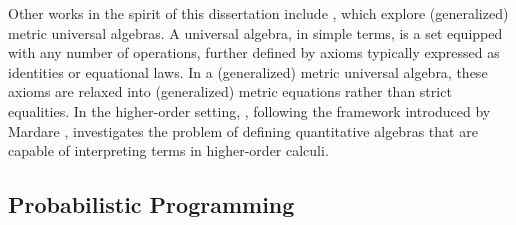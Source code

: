 Other works in the spirit of this dissertation include \cite{mardare2016quantitative, mardare2017axiomatizability, mio24, jurka24}, which explore (generalized) metric universal algebras. A universal algebra, in simple terms, is a set equipped with any number of operations, further defined  by axioms typically expressed as identities or equational laws. In a (generalized) metric universal algebra, these axioms are relaxed into (generalized) metric equations rather than strict equalities. In the higher-order setting, \cite{lago22}, following the framework introduced by Mardare \cite{mardare2016quantitative}, investigates the problem of defining quantitative algebras that are capable of interpreting terms in higher-order calculi.



\begin{comment}
Remarkably a number of important results already considered additive structure
in the quantalic setting, even if sometimes implicitly.
References~\cite{mardare2016quantitative,mardare2017axiomatizability,mio24,jurka24}
for example are framed in the setting of universal algebra and therefore
involve additive conjunction (\ie\ $\&$), typically interpreted via categorical
products.  In the higher-order setting, \cite{lago22} enforces additive
conjunction to be left adjoint to implication (interpreted via
Cartesian-closedness), with a series of negative results emerging from this.
Our work is orthogonal to these in that we study the dual of $\&$ (\ie\
$\oplus$) and furthermore we assume the left adjoint of implication to be
multiplicative conjunction (\ie\ $\otimes$) instead of the additive
counterpart. Among other things, this removes the obstacles discussed
in~\cite{lago22}.
\end{comment}



\subsection*{Probabilistic Programming}




